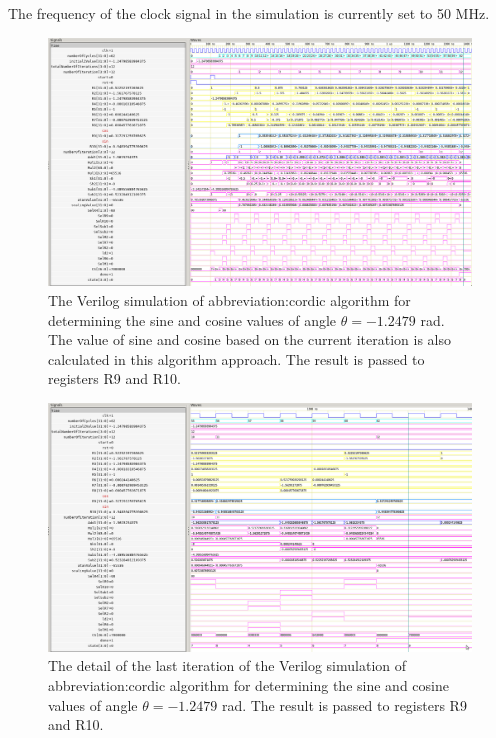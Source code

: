 \documentclass[a4paper, twoside, 11pt]{article}
\begin{document}
    The frequency of the clock signal in the simulation is currently set to 50 MHz.

        \begin{figure}[htbp!]
            \centering
            \includegraphics[width=1\textwidth]{src/png/inverted/cordic-verilog-whole-sim.png}
            \caption{The Verilog simulation of \gls{abbreviation:cordic} algorithm for determining the sine and cosine values of angle $\theta = -1.2479$ rad. The value of sine and cosine based on the current iteration is also calculated in this algorithm approach. The result is passed to registers R9 and R10.}
            \label{fig:cordic-verilog-whole-sim}
        \end{figure}

        \begin{figure}[htbp!]
            \centering
            \includegraphics[width=1\textwidth]{src/png/inverted/cordic-verilog-end-of-the-simulation.png}
            \caption{The detail of the last iteration of the Verilog simulation of \gls{abbreviation:cordic} algorithm for determining the sine and cosine values of angle $\theta = -1.2479$ rad. The result is passed to registers R9 and R10.}
            \label{fig:cordic-verilog-end-of-the-simulation}
        \end{figure}
\end{document}
